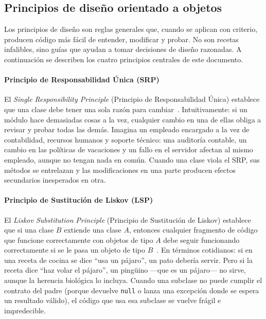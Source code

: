 \documentclass[11pt,a4paper]{article}
\newcommand{\code}[1]{\texttt{#1}}
\begin{document}
\subsection{Principios de diseño orientado a objetos}
\label{sec:fund-principios}

Los principios de diseño son reglas generales que, cuando se aplican con
criterio, producen código más fácil de entender, modificar y probar.  No son
recetas infalibles, sino guías que ayudan a tomar decisiones de diseño
razonadas.  A continuación se describen los cuatro principios centrales de
este documento.

\label{sec:fund-srp}
\paragraph{Principio de Responsabilidad Única (SRP)}

El \emph{Single Responsibility Principle} (Principio de Responsabilidad Única)
establece que una clase debe tener una sola razón para cambiar~\cite{martin2003}.
Intuitivamente: si un módulo hace demasiadas cosas a la vez, cualquier cambio
en una de ellas obliga a revisar y probar todas las demás.  Imagina un empleado
encargado a la vez de contabilidad, recursos humanos y soporte técnico: una
auditoría contable, un cambio en las políticas de vacaciones y un fallo en el
servidor afectan al mismo empleado, aunque no tengan nada en común.  Cuando una
clase viola el SRP, sus métodos se entrelazan y las modificaciones en una parte
producen efectos secundarios inesperados en otra.

\label{sec:fund-lsp}
\paragraph{Principio de Sustitución de Liskov (LSP)}

El \emph{Liskov Substitution Principle} (Principio de Sustitución de Liskov)
establece que si una clase $B$ extiende una clase $A$, entonces cualquier
fragmento de código que funcione correctamente con objetos de tipo $A$ debe
seguir funcionando correctamente si se le pasa un objeto de tipo $B$~\cite{liskov1994}.
En términos cotidianos: si en una receta de cocina se dice ``usa un pájaro'',
un pato debería servir.  Pero si la receta dice ``haz volar el pájaro'', un
pingüino ---que es un pájaro--- no sirve, aunque la herencia biológica lo
incluya.  Cuando una subclase no puede cumplir el contrato del padre (porque
devuelve \code{null} o lanza una excepción donde se espera un resultado válido),
el código que usa esa subclase se vuelve frágil e impredecible.
\end{document}
